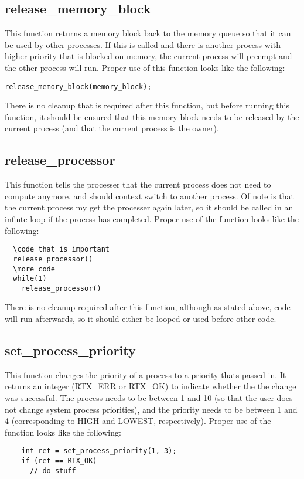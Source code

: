 \documentclass[12pt]{article}
\begin{document}
\subsection{release\_memory\_block}\label{releasememoryblockf}
  This function returns a memory block back to the memory queue so that it can be used by other processes. If this is called and there is another process with higher priority that is blocked on memory, the current process will preempt and the other process will run. Proper use of this function looks like the following:
  \begin{lstlisting}
release_memory_block(memory_block);
  \end{lstlisting}
  There is no cleanup that is required after this function, but before running this function, it should be ensured that this memory block needs to be released by the current process (and that the current process is the owner).
\subsection{release\_processor}\label{releaseprocessorf}
  This function tells the processer that the current process does not need to compute anymore, and should context switch to another process. Of note is that the current process my get the processer again later, so it should be called in an infinte loop if the process has completed. Proper use of the function looks like the following:
  \begin{lstlisting}
  \code that is important
  release_processor()
  \more code
  while(1)
    release_processor()
  \end{lstlisting}
  There is no cleanup required after this function, although as stated above, code will run afterwards, so it should either be looped or used before other code.
\subsection{set\_process\_priority}\label{setprocesspriorityf}
  This function changes the priority of a process to a priority thats passed in. It returns an integer (RTX\_ERR or RTX\_OK) to indicate whether the the change was successful. The process needs to be between 1 and 10 (so that the user does not change system process priorities), and the priority needs to be between 1 and 4 (corresponding to HIGH and LOWEST, respectively). Proper use of the function looks like the following:
  \begin{lstlisting}
    int ret = set_process_priority(1, 3);
    if (ret == RTX_OK)
      // do stuff
  \end{lstlisting}
\end{document}
